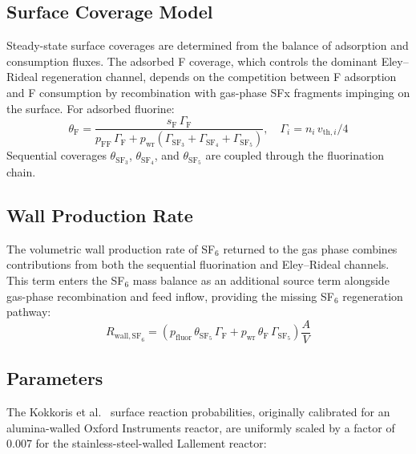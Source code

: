 \documentclass[11pt,a4paper]{report}
\begin{document}
\subsection{Surface Coverage Model}
\label{sec:wall_coverage}

Steady-state surface coverages are determined from the balance of adsorption and consumption fluxes.  The adsorbed F coverage, which controls the dominant Eley--Rideal regeneration channel, depends on the competition between F adsorption and F consumption by recombination with gas-phase SFx fragments impinging on the surface.  For adsorbed fluorine:
\begin{equation}
\boxed{\theta_\mathrm{F} = \frac{s_\mathrm{F}\,\Gamma_\mathrm{F}}{p_\mathrm{FF}\,\Gamma_\mathrm{F} + p_\mathrm{wr}(\Gamma_{\mathrm{SF}_3}+\Gamma_{\mathrm{SF}_4}+\Gamma_{\mathrm{SF}_5})}, \quad \Gamma_i = n_i\, v_{\mathrm{th},i}/4}
\label{eq:wall_thetaF}
\end{equation}
Sequential coverages $\theta_{\mathrm{SF}_3}$, $\theta_{\mathrm{SF}_4}$, and $\theta_{\mathrm{SF}_5}$ are coupled through the fluorination chain.

\subsection{Wall Production Rate}
\label{sec:wall_production}

The volumetric wall production rate of SF$_6$ returned to the gas phase combines contributions from both the sequential fluorination and Eley--Rideal channels.  This term enters the SF$_6$ mass balance as an additional source term alongside gas-phase recombination and feed inflow, providing the missing SF$_6$ regeneration pathway:
\begin{equation}
\boxed{R_{\mathrm{wall,SF}_6} = \left(p_\mathrm{fluor}\,\theta_{\mathrm{SF}_5}\,\Gamma_\mathrm{F} + p_\mathrm{wr}\,\theta_\mathrm{F}\,\Gamma_{\mathrm{SF}_5}\right)\frac{A}{V}}
\label{eq:wall_Rwall}
\end{equation}

\subsection{Parameters}
\label{sec:wall_params}

The Kokkoris et al.~\cite{Kokkoris2009} surface reaction probabilities, originally calibrated for an alumina-walled Oxford Instruments reactor, are uniformly scaled by a factor of 0.007 for the stainless-steel-walled Lallement reactor:
\end{document}
